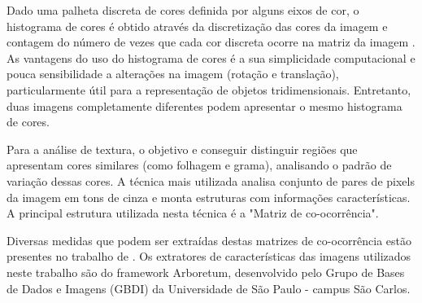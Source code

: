 Dado uma palheta discreta de cores definida por alguns eixos de cor, o histograma de cores é obtido através da discretização das cores da imagem e contagem
do número de vezes que cada cor discreta ocorre na matriz da imagem \cite{Swain1991}. As vantagens do uso do histograma de cores é a sua simplicidade computacional e pouca
sensibilidade a alterações na imagem (rotação e translação), particularmente útil para a representação de objetos tridimensionais. Entretanto, duas imagens completamente 
diferentes podem apresentar o mesmo histograma de cores.\par

Para a análise de textura, o objetivo e conseguir distinguir regiões que apresentam cores similares (como folhagem e grama), analisando o padrão
de variação dessas cores. A técnica mais utilizada analisa conjunto de pares de pixels da imagem em tons de cinza e monta estruturas com informações características.
A principal estrutura utilizada nesta técnica é a "Matriz de co-ocorrência".\par %
Diversas medidas que podem ser extraídas destas matrizes de co-ocorrência estão presentes no trabalho de \cite{Haralick1973}. Os extratores de características das imagens utilizados 
neste trabalho são do framework Arboretum, desenvolvido pelo Grupo de Bases de Dados e Imagens (GBDI) da Universidade de São Paulo - campus São Carlos.




